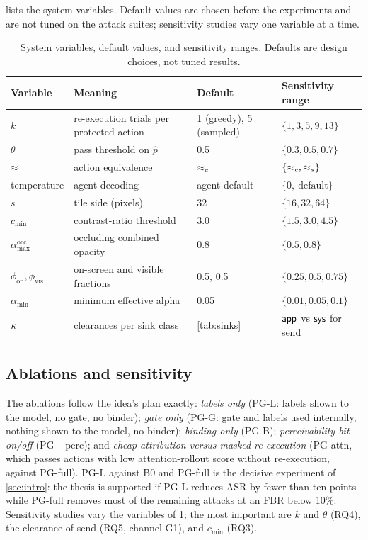  lists the system variables. Default values are chosen before the experiments and are not tuned on the attack suites; sensitivity studies vary one variable at a time.

\begin{table}[t]
\centering
\caption{System variables, default values, and sensitivity ranges. Defaults are design choices, not tuned results.}
\label{tab:hyper}
\footnotesize
\begin{tabularx}{\textwidth}{@{}l X l l@{}}
\toprule
Variable & Meaning & Default & Sensitivity range \\
\midrule
$k$ & re-execution trials per protected action & 1 (greedy), 5 (sampled) & $\{1,3,5,9,13\}$ \\
$\theta$ & pass threshold on $\hat p$ & 0.5 & $\{0.3,0.5,0.7\}$ \\
$\approx$ & action equivalence & $\approx_c$ & $\{\approx_c,\approx_s\}$ \\
temperature & agent decoding & agent default & $\{0,\ \text{default}\}$ \\
$s$ & tile side (pixels) & 32 & $\{16,32,64\}$ \\
$c_{\min}$ & contrast-ratio threshold & 3.0 & $\{1.5,3.0,4.5\}$ \\
$\alpha^{\mathrm{occ}}_{\max}$ & occluding combined opacity & 0.8 & $\{0.5,0.8\}$ \\
$\phi_{\mathrm{on}},\phi_{\mathrm{vis}}$ & on-screen and visible fractions & 0.5, 0.5 & $\{0.25,0.5,0.75\}$ \\
$\alpha_{\min}$ & minimum effective alpha & 0.05 & $\{0.01,0.05,0.1\}$ \\
$\kappa$ & clearances per sink class & \cref{tab:sinks} & $\textsf{app}$ vs $\textsf{sys}$ for \textsf{send} \\
\bottomrule
\end{tabularx}
\end{table}

\subsection{Ablations and sensitivity}\label{sec:ablations}

The ablations follow the idea's plan exactly: \emph{labels only} (PG-L: labels shown to the model, no gate, no binder); \emph{gate only} (PG-G: gate and labels used internally, nothing shown to the model, no binder); \emph{binding only} (PG-B); \emph{perceivability bit on/off} (PG $-$perc); and \emph{cheap attribution versus masked re-execution} (PG-attn, which passes actions with low attention-rollout score without re-execution, against PG-full). PG-L against B0 and PG-full is the decisive experiment of \cref{sec:intro}: the thesis is supported if PG-L reduces ASR by fewer than ten points while PG-full removes most of the remaining attacks at an FBR below 10\%. Sensitivity studies vary the variables of \cref{tab:hyper}; the most important are $k$ and $\theta$ (RQ4), the clearance of \textsf{send} (RQ5, channel G1), and $c_{\min}$ (RQ3).

